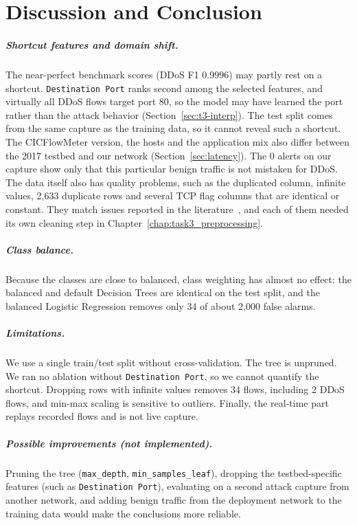 \chapter{Discussion and Conclusion}\label{chap:discussion}

\paragraph{Shortcut features and domain shift.} The near-perfect benchmark scores (DDoS F1 0.9996) may partly rest on a shortcut. \texttt{Destination Port} ranks second among the selected features, and virtually all DDoS flows target port 80, so the model may have learned the port rather than the attack behavior (Section~\ref{sec:t3-interp}). The test split comes from the same capture as the training data, so it cannot reveal such a shortcut. The CICFlowMeter version, the hosts and the application mix also differ between the 2017 testbed and our network (Section~\ref{sec:latency}). The 0 alerts on our capture show only that this particular benign traffic is not mistaken for DDoS. The data itself also has quality problems, such as the duplicated column, infinite values, 2,633 duplicate rows and several TCP flag columns that are identical or constant. They match issues reported in the literature~\cite{engelen2021troubleshooting}, and each of them needed its own cleaning step in Chapter~\ref{chap:task3_preprocessing}.

\paragraph{Class balance.} Because the classes are close to balanced, class weighting has almost no effect: the balanced and default Decision Trees are identical on the test split, and the balanced Logistic Regression removes only 34 of about 2,000 false alarms.

\paragraph{Limitations.} We use a single train/test split without cross-validation. The tree is unpruned. We ran no ablation without \texttt{Destination Port}, so we cannot quantify the shortcut. Dropping rows with infinite values removes 34 flows, including 2 DDoS flows, and min-max scaling is sensitive to outliers. Finally, the real-time part replays recorded flows and is not live capture.

\paragraph{Possible improvements (not implemented).} Pruning the tree (\texttt{max\_depth}, \texttt{min\_samples\_leaf}), dropping the testbed-specific features (such as \texttt{Destination Port}), evaluating on a second attack capture from another network, and adding benign traffic from the deployment network to the training data would make the conclusions more reliable.

